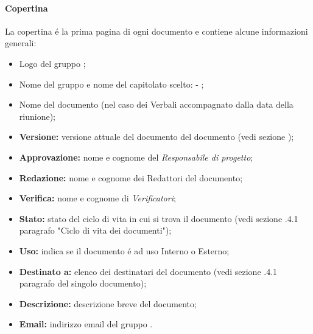       \paragraph{Copertina\\}
      La copertina é la prima pagina di ogni documento e contiene alcune informazioni generali:
      \begin{itemize}
        \item Logo del gruppo \Gruppo{};
        \item Nome del gruppo e nome del capitolato scelto: \Gruppo{} - \NomeProgetto{};
        \item Nome del documento (nel caso dei Verbali accompagnato dalla data della riunione);
        \item \textbf{Versione:} versione attuale del documento del documento (vedi sezione );%
        \item \textbf{Approvazione:} nome e cognome del \textit{Responsabile di progetto};
        \item \textbf{Redazione:} nome e cognome dei Redattori del documento;
        \item \textbf{Verifica:} nome e cognome di \textit{Verificatori};
        \item \textbf{Stato:} stato del ciclo di vita in cui si trova il documento (vedi sezione .4.1 paragrafo "Ciclo di vita dei documenti");
        \item \textbf{Uso:} indica se il documento é ad uso Interno o Esterno;
        \item \textbf{Destinato a:} elenco dei destinatari del documento (vedi sezione .4.1 paragrafo del singolo documento);
        \item \textbf{Descrizione:} descrizione breve del documento;
        \item \textbf{Email:} indirizzo email del gruppo \Gruppo{}.
      \end{itemize}

